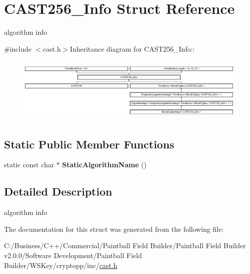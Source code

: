\hypertarget{struct_c_a_s_t256___info}{
\section{CAST256\_\-Info Struct Reference}
\label{struct_c_a_s_t256___info}
}


algorithm info  


{\ttfamily \#include $<$cast.h$>$}Inheritance diagram for CAST256\_\-Info::\begin{figure}[H]
\begin{center}
\leavevmode
\includegraphics[height=3.15789cm]{struct_c_a_s_t256___info}
\end{center}
\end{figure}
\subsection*{Static Public Member Functions}
\begin{DoxyCompactItemize}
\item 
\hypertarget{struct_c_a_s_t256___info_aa47c3f897b7d323a9f23ae77604d409c}{
static const char $\ast$ {\bfseries StaticAlgorithmName} ()}
\label{struct_c_a_s_t256___info_aa47c3f897b7d323a9f23ae77604d409c}

\end{DoxyCompactItemize}


\subsection{Detailed Description}
algorithm info 

The documentation for this struct was generated from the following file:\begin{DoxyCompactItemize}
\item 
C:/Business/C++/Commercial/Paintball Field Builder/Paintball Field Builder v2.0.0/Software Development/Paintball Field Builder/WSKey/cryptopp/inc/\hyperlink{cast_8h}{cast.h}\end{DoxyCompactItemize}
